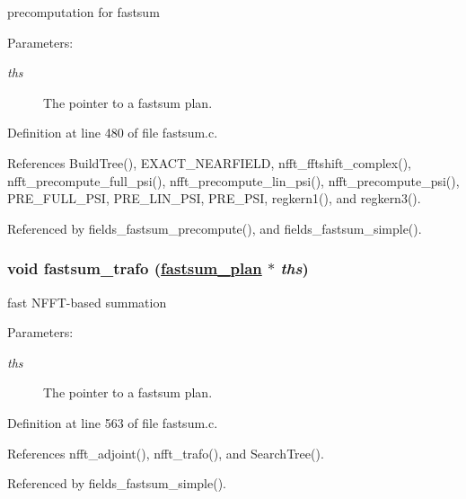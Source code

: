 precomputation for fastsum 

\begin{Desc}
\item[Parameters:]
\begin{description}
\item[{\em ths}]The pointer to a fastsum plan. \end{description}
\end{Desc}


Definition at line 480 of file fastsum.c.

References Build\-Tree(), EXACT\_\-NEARFIELD, nfft\_\-fftshift\_\-complex(), nfft\_\-precompute\_\-full\_\-psi(), nfft\_\-precompute\_\-lin\_\-psi(), nfft\_\-precompute\_\-psi(), PRE\_\-FULL\_\-PSI, PRE\_\-LIN\_\-PSI, PRE\_\-PSI, regkern1(), and regkern3().

Referenced by fields\_\-fastsum\_\-precompute(), and fields\_\-fastsum\_\-simple().\hypertarget{group__applications__fastsum_ga17}{
\subsubsection[fastsum\_\-trafo]{\setlength{\rightskip}{0pt plus 5cm}void fastsum\_\-trafo (\hyperlink{structfastsum__plan__}{fastsum\_\-plan} $\ast$ {\em ths})}}
\label{group__applications__fastsum_ga17}


fast NFFT-based summation 

\begin{Desc}
\item[Parameters:]
\begin{description}
\item[{\em ths}]The pointer to a fastsum plan. \end{description}
\end{Desc}


Definition at line 563 of file fastsum.c.

References nfft\_\-adjoint(), nfft\_\-trafo(), and Search\-Tree().

Referenced by fields\_\-fastsum\_\-simple().